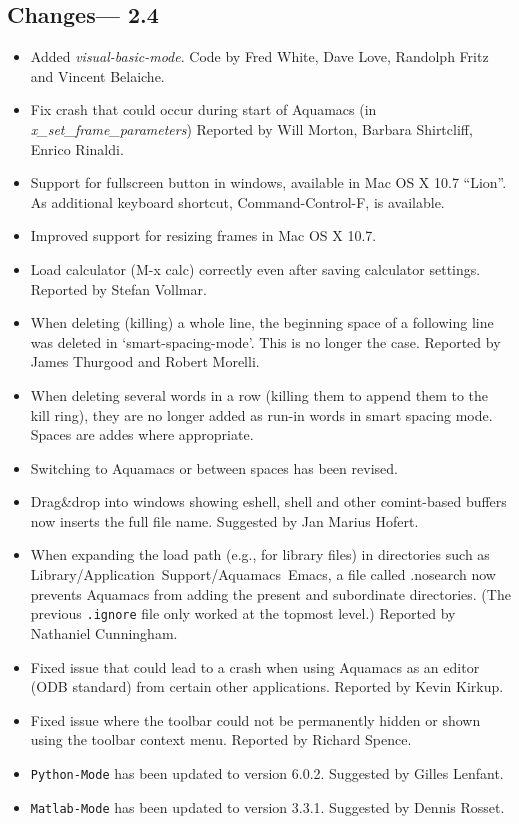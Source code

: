 \subsection{Changes--- 2.4}
\begin{itemize}
\item Added {\it visual-basic-mode}.
Code by Fred White, Dave Love, Randolph Fritz and Vincent Belaiche.
\item Fix crash that could occur during start of Aquamacs (in {\it x\_set\_frame\_parameters})
Reported by Will Morton, Barbara Shirtcliff, Enrico Rinaldi.
\item Support for fullscreen button in windows, available in Mac OS X 10.7 ``Lion''.  As additional keyboard shortcut, Command-Control-F, is available.
\item Improved support for resizing frames in Mac OS X 10.7.
\item Load calculator (M-x calc) correctly even after saving calculator settings.
Reported by Stefan Vollmar.
\item When deleting (killing) a whole line, the beginning space of a following line was deleted in `smart-spacing-mode'.  This is no longer the case.
Reported by James Thurgood and Robert Morelli.
\item When deleting several words in a row (killing them to append them to the kill ring), they are no longer added as run-in words in smart spacing mode.  Spaces are addes where appropriate.
\item Switching to Aquamacs or between spaces has been revised.
\item Drag\&drop into windows showing eshell, shell and other comint-based buffers now inserts the full file name.
Suggested by Jan Marius Hofert.
\item When expanding the load path (e.g., for library files) in directories such as Library/Application~Support/Aquamacs~Emacs, a file called {.nosearch} now prevents Aquamacs from adding the present and subordinate directories.  (The previous {\tt .ignore} file only worked at the topmost level.)
Reported by Nathaniel Cunningham.
\item Fixed issue that could lead to a crash when using Aquamacs as an editor (ODB standard) from certain other applications.
Reported by Kevin Kirkup.
\item Fixed issue where the toolbar could not be permanently hidden or shown using the toolbar context menu.
Reported by Richard Spence.
\item {\tt Python-Mode} has been updated to version 6.0.2.
Suggested by Gilles Lenfant.
\item {\tt Matlab-Mode} has been updated to version 3.3.1.
Suggested by Dennis Rosset.
\end{itemize}


